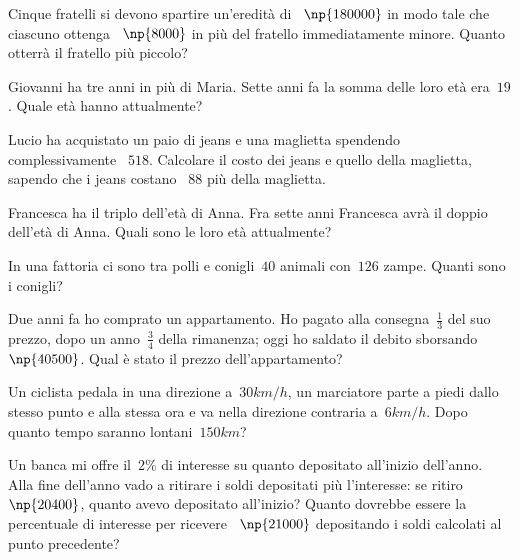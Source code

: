 \begin{multicols}{2}
\begin{esercizio}[\Ast]
\label{ese:16.58}
Cinque fratelli si devono spartire un'eredità di \officialeuro~$\np{180000}$ in modo tale che ciascuno ottenga \officialeuro~$\np{8000}$ in più del fratello immediatamente minore. Quanto otterrà il fratello più piccolo?
\end{esercizio}

\begin{esercizio}[\Ast]
\label{ese:16.59}
Giovanni ha tre anni in più di Maria. Sette anni fa la somma delle loro età era~$19$. Quale età hanno attualmente?
\end{esercizio}

\begin{esercizio}[\Ast]
\label{ese:16.60}
Lucio ha acquistato un paio di jeans e una maglietta spendendo complessivamente \officialeuro~$518$. Calcolare il costo dei jeans e quello della maglietta, sapendo che i jeans costano \officialeuro~$88$ più della maglietta.
\end{esercizio}

\begin{esercizio}[\Ast]
\label{ese:16.61}
Francesca ha il triplo dell'età di Anna. Fra sette anni Francesca avrà il doppio dell'età di Anna. Quali sono le loro età attualmente?
\end{esercizio}

\begin{esercizio}[\Ast]
\label{ese:16.62}
In una fattoria ci sono tra polli e conigli~$40$ animali con~$126$ zampe. Quanti sono i conigli?
\end{esercizio}

\begin{esercizio}[\Ast]
\label{ese:16.63}
Due anni fa ho comprato un appartamento. Ho pagato alla consegna~$\frac{1}{3}$ del suo prezzo, dopo un anno~$\frac{3}{4}$ della rimanenza; oggi ho saldato il debito sborsando \officialeuro~$\np{40500}$. Qual è stato il prezzo dell'appartamento?
\end{esercizio}

\begin{esercizio}[\Ast]
\label{ese:16.64}
Un ciclista pedala in una direzione a~$30\unit{km/h}$, un marciatore parte a piedi dallo stesso punto e alla stessa ora e va nella direzione contraria a~$6\unit{km/h}$. Dopo quanto tempo saranno lontani~$150\unit{km}$?
\end{esercizio}

\begin{esercizio}[\Ast]
\label{ese:16.65}
Un banca mi offre il~$2\%$ di interesse su quanto depositato all'inizio dell'anno. Alla fine dell'anno vado a ritirare i soldi depositati più l'interesse: se ritiro \officialeuro~$\np{20400}$, quanto avevo depositato all'inizio? Quanto dovrebbe essere la percentuale di interesse per ricevere \officialeuro~$\np{21000}$ depositando i soldi calcolati al punto precedente?
\end{esercizio}


\end{multicols}
